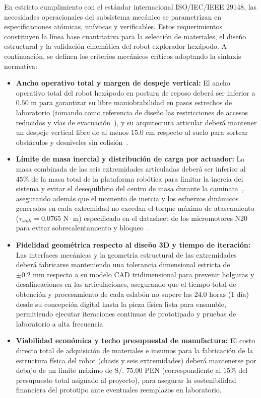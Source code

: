 En estricto cumplimiento con el estándar internacional ISO/IEC/IEEE 29148, las necesidades operacionales del subsistema mecánico se parametrizan en especificaciones atómicas, unívocas y verificables. Estos requerimientos constituyen la línea base cuantitativa para la selección de materiales, el diseño estructural y la validación cinemática del robot explorador hexápodo. A continuación, se definen los criterios mecánicos críticos adoptando la sintaxis normativa:

\begin{itemize}
    \item \textbf{Ancho operativo total y margen de despeje vertical:} El ancho operativo total del robot hexápodo en postura de reposo deberá ser inferior a $0.50\text{ m}$ para garantizar su libre maniobrabilidad en pasos estrechos de laboratorio (tomando como referencia de diseño las restricciones de accesos reducidos y vías de evacuación~\cite{MINEM_DS024_2016}), y su arquitectura articular deberá mantener un despeje vertical libre de al menos $15.0\text{ cm}$ respecto al suelo para sortear obstáculos y desniveles sin colisión~\cite{Obosu2025_Automation}.
    \item \textbf{Límite de masa inercial y distribución de carga por actuador:} La masa combinada de las seis extremidades articuladas deberá ser inferior al $45\%$ de la masa total de la plataforma robótica para limitar la inercia del sistema y evitar el desequilibrio del centro de masa durante la caminata~\cite{Sensors2021_HexapodReview}, asegurando además que el momento de inercia y los esfuerzos dinámicos generados en cada extremidad no excedan el torque máximo de atascamiento ($\tau_{stall} = 0.0765\text{ N}\cdot\text{m}$) especificado en el datasheet de los micromotores N20 para evitar sobrecalentamiento y bloqueo~\cite{N20_Datasheet}.
    \item \textbf{Fidelidad geométrica respecto al diseño 3D y tiempo de iteración:} Las interfaces mecánicas y la geometría estructural de las extremidades deberá fabricarse manteniendo una tolerancia dimensional estricta de $\pm 0.2\text{ mm}$ respecto a su modelo CAD tridimensional para prevenir holguras y desalineaciones en las articulaciones, asegurando que el tiempo total de obtención y procesamiento de cada eslabón no supere las $24.0\text{ horas}$ ($1\text{ día}$) desde su concepción digital hasta la pieza física lista para ensamble, permitiendo ejecutar iteraciones continuas de prototipado y pruebas de laboratorio a alta frecuencia
    \item \textbf{Viabilidad económica y techo presupuestal de manufactura:} El costo directo total de adquisición de materiales e insumos para la fabricación de la estructura física del robot (chasis y seis extremidades) deberá mantenerse por debajo de un límite máximo de $\text{S/. 75.00 PEN}$ (correspondiente al $15\%$ del presupuesto total asignado al proyecto), para asegurar la sostenibilidad financiera del prototipo ante eventuales reemplazos en laboratorio.
\end{itemize}


